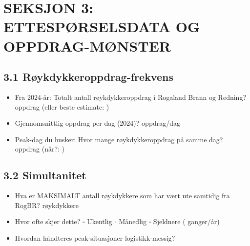 \documentclass[12pt, a4paper, norsk]{article}
\begin{document}
\newpage

\section*{SEKSJON 3: ETTESPØRSELSDATA OG OPPDRAG-MØNSTER}

\subsection*{3.1 Røykdykkeroppdrag-frekvens}

\vspace{0.3cm}

\begin{itemize}
\item[\textbf{Q:}] Fra 2024-år: Totalt antall røykdykkeroppdrag i Rogaland Brann og Redning?
  \newline\underline{\hspace{6cm}} oppdrag (eller beste estimate: \underline{\hspace{2cm}})

\item[\textbf{Q:}] Gjennomsnittlig oppdrag per dag (2024)?
  \newline\underline{\hspace{6cm}} oppdrag/dag

\item[\textbf{Q:}] Peak-dag du husker: Hvor mange røykdykkeroppdrag på samme dag?
  \newline\underline{\hspace{6cm}} oppdrag (når?: \underline{\hspace{3cm}})
\end{itemize}

\subsection*{3.2 Simultanitet}

\vspace{0.3cm}

\begin{itemize}
\item[\textbf{Q:}] Hva er MAKSIMALT antall røykdykkere som har vært ute samtidig fra RogBR?
  \newline\underline{\hspace{6cm}} røykdykkere

\item[\textbf{Q:}] Hvor ofte skjer dette?
  \newline $\square$ Ukentlig \quad $\square$ Månedlig \quad $\square$ Sjeldnere (\underline{\hspace{3cm}} ganger/år)

\item[\textbf{Q:}] Hvordan håndteres peak-situasjoner logistikk-messig?
  \newline\underline{\hspace{12cm}}
\end{itemize}
\end{document}

